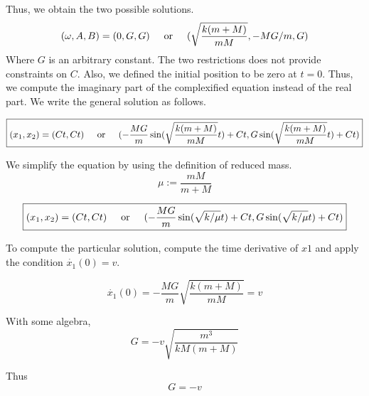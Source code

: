 \documentclass{article}
\newcommand{\textOr}{
    {
        \hspace{5mm}
        \textrm{or}
        \hspace{5mm}
    }
}
\begin{document}
Thus, we obtain the two possible solutions. 
\[
    (\omega, A, B) = (0, G, G) \textOr (\sqrt{\frac{k(m+M)}{mM}}, -MG/m, G)
\]
Where $G$ is an arbitrary constant. The two restrictions 
does not provide constraints on $C$. 
Also, we defined the initial position to be zero at $t = 0$. 
Thus, we compute the imaginary part of the complexified equation 
instead of the real part. 
We write the general solution 
as follows. 

\[
    \boxed{
    (x_1, x_2) = (Ct, Ct) 
    \textOr 
    (-\frac{MG}{m}\sin(\sqrt{\frac{k(m+M)}{mM}} t)+ Ct, G\sin(\sqrt{\frac{k(m+M)}{mM}} t)+ Ct)
    }
\]


We simplify the equation by using the definition of reduced mass. 
\[
    \mu := \frac{mM}{m + M}
\]

\[
    \boxed{
    (x_1, x_2) = (Ct, Ct) 
    \textOr 
    (-\frac{MG}{m}\sin(\sqrt{k/ \mu} t)+ Ct, G\sin(\sqrt{k/\mu} t)+ Ct)}
\]

To compute the particular solution, compute the time derivative 
of $x1$ and apply the condition $\dot{x_1}(0) = v$. 

\[
    \dot{x_1}(0) = -\frac{MG}{m} \sqrt{\frac{
        k(m + M)
    }{mM}} = v
\]


With some algebra, 
\[
    G = -v\sqrt{\frac{m^3}{kM(m+M)}}
    \]


Thus 
\[
    G = -v
\]
\end{document}
